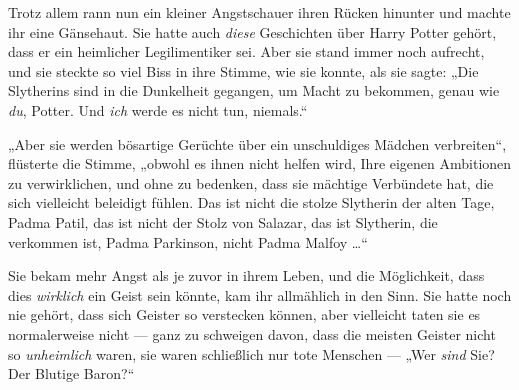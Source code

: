Trotz allem rann nun ein kleiner Angstschauer ihren Rücken hinunter und machte ihr eine Gänsehaut. Sie hatte auch \emph{diese} Geschichten über Harry Potter gehört, dass er ein heimlicher Legilimentiker sei. Aber sie stand immer noch aufrecht, und sie steckte so viel Biss in ihre Stimme, wie sie konnte, als sie sagte:
„Die Slytherins sind in die Dunkelheit gegangen, um Macht zu bekommen, genau wie \emph{du}, Potter. Und \emph{ich} werde es nicht tun, niemals.“

„Aber sie werden bösartige Gerüchte über ein unschuldiges Mädchen verbreiten“, flüsterte die Stimme, „obwohl es ihnen nicht helfen wird, Ihre eigenen Ambitionen zu verwirklichen, und ohne zu bedenken, dass sie mächtige Verbündete hat, die sich vielleicht beleidigt fühlen. Das ist nicht die stolze Slytherin der alten Tage, Padma Patil, das ist nicht der Stolz von Salazar, das ist Slytherin, die verkommen ist, Padma Parkinson, nicht Padma Malfoy …“

Sie bekam mehr Angst als je zuvor in ihrem Leben, und die Möglichkeit, dass dies \emph{wirklich} ein Geist sein könnte, kam ihr allmählich in den Sinn. Sie hatte noch nie gehört, dass sich Geister so verstecken können, aber vielleicht taten sie es normalerweise nicht — ganz zu schweigen davon, dass die meisten Geister nicht so \emph{unheimlich} waren, sie waren schließlich nur tote Menschen —
„Wer \emph{sind} Sie? Der Blutige Baron?“

